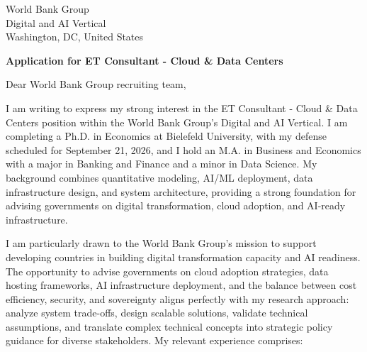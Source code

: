 \documentclass[11pt]{article}
\begin{document}
\vspace{0.1cm}

\vspace{0.1cm}

\noindent
World Bank Group \\
Digital and AI Vertical \\
Washington, DC, United States

\vspace{0.12cm}

\noindent
\textbf{Application for ET Consultant - Cloud \& Data Centers}

\vspace{0.1cm}

\noindent Dear World Bank Group recruiting team,

I am writing to express my strong interest in the ET Consultant - Cloud \& Data Centers position within the World Bank Group's Digital and AI Vertical. 
I am completing a Ph.D. in Economics at Bielefeld University, with my defense scheduled for September 21, 2026, 
and I hold an M.A. in Business and Economics with a major in Banking and Finance and a minor in Data Science. 
My background combines quantitative modeling, AI/ML deployment, data infrastructure design, and system architecture, 
providing a strong foundation for advising governments on digital transformation, cloud adoption, and AI-ready infrastructure.

I am particularly drawn to the World Bank Group's mission to support developing countries in building digital transformation capacity and AI readiness. 
The opportunity to advise governments on cloud adoption strategies, data hosting frameworks, AI infrastructure deployment, 
and the balance between cost efficiency, security, and sovereignty aligns perfectly with my research approach: 
analyze system trade-offs, design scalable solutions, validate technical assumptions, 
and translate complex technical concepts into strategic policy guidance for diverse stakeholders.
My relevant experience comprises:
\end{document}

